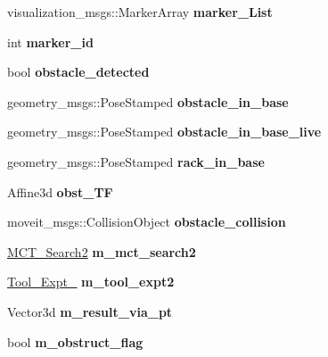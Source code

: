 \begin{DoxyCompactItemize}
\mbox{\label{structManipulate_ab03d26b977eb93dafaf95c3f8cc67925}} 
visualization\+\_\+msgs\+::\+Marker\+Array {\bfseries marker\+\_\+\+List}
\item 
\mbox{\label{structManipulate_ae8b7fb29f0c73fadf64dc7419e05e769}} 
int {\bfseries marker\+\_\+id}
\item 
\mbox{\label{structManipulate_a1b4c9d79aed5e0d2b5848016fb7536c0}} 
bool {\bfseries obstacle\+\_\+detected}
\item 
\mbox{\label{structManipulate_a28a65d43d447611b77c65945e4d7c5b3}} 
geometry\+\_\+msgs\+::\+Pose\+Stamped {\bfseries obstacle\+\_\+in\+\_\+base}
\item 
\mbox{\label{structManipulate_ac35fc3b3c0281b574566bc011c9c002d}} 
geometry\+\_\+msgs\+::\+Pose\+Stamped {\bfseries obstacle\+\_\+in\+\_\+base\+\_\+live}
\item 
\mbox{\label{structManipulate_ad6859e01fea4ebc0cf089d7cfc0ba5f3}} 
geometry\+\_\+msgs\+::\+Pose\+Stamped {\bfseries rack\+\_\+in\+\_\+base}
\item 
\mbox{\label{structManipulate_a1468f46348aff5521c0248a866820190}} 
Affine3d {\bfseries obst\+\_\+\+TF}
\item 
\mbox{\label{structManipulate_ae0847bd05155f8c4704dafc0a65bd851}} 
moveit\+\_\+msgs\+::\+Collision\+Object {\bfseries obstacle\+\_\+collision}
\item 
\mbox{\label{structManipulate_a4571cb4a454c886c3fe05dc3165e203d}} 
\hyperlink{classMCT__Search2}{M\+C\+T\+\_\+\+Search2} {\bfseries m\+\_\+mct\+\_\+search2}
\item 
\mbox{\label{structManipulate_adf9b32536181a0621672b5c0430eae70}} 
\hyperlink{classTool__Expt__2}{Tool\+\_\+\+Expt\+\_} {\bfseries m\+\_\+tool\+\_\+expt2}
\item 
\mbox{\label{structManipulate_a575bc14d110410cb3d496360bb823bc7}} 
Vector3d {\bfseries m\+\_\+result\+\_\+via\+\_\+pt}
\item 
\mbox{\label{structManipulate_ab1cde6e32ae3b17f64cdd8aa66b69fd7}} 
bool {\bfseries m\+\_\+obstruct\+\_\+flag}
\end{DoxyCompactItemize}


